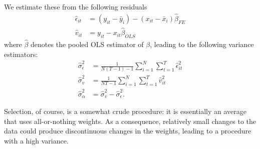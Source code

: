 We estimate these from the following residuals
\begin{align*}
\widehat{\epsilon}_{it}& = (y_{it} -\bar{y}_i) - (x_{it} - \bar{x}_i) \widehat{\beta}_{FE}\\
\widehat{v}_{it} &= y_{it} - x_{it} \widehat{\beta}_{OLS}
\end{align*} 
where $\widehat{\beta}$ denotes the pooled OLS estimator of $\beta$, leading to the following variance estimators: 
\begin{align*}
\widehat{\sigma}_\epsilon^2 &= \frac{1}{N(T-1)-1} \sum_{i=1}^N \sum_{t=1}^T \widehat{\epsilon}_{it}^2\\
\widehat{\sigma}_v^2 &= \frac{1}{NT-1} \sum_{i=1}^N \sum_{t=1}^T \widehat{v}_{it}^2\\
\widehat{\sigma}_\alpha^2 &= \widehat{\sigma}_v^2 - \widehat{\sigma}_\epsilon^2.
\end{align*}

Selection, of course, is a somewhat crude procedure: it is essentially an average that uses all-or-nothing weights.
As a consequence, relatively small changes to the data could produce discontinuous changes in the weights, leading to a procedure with a high variance.
